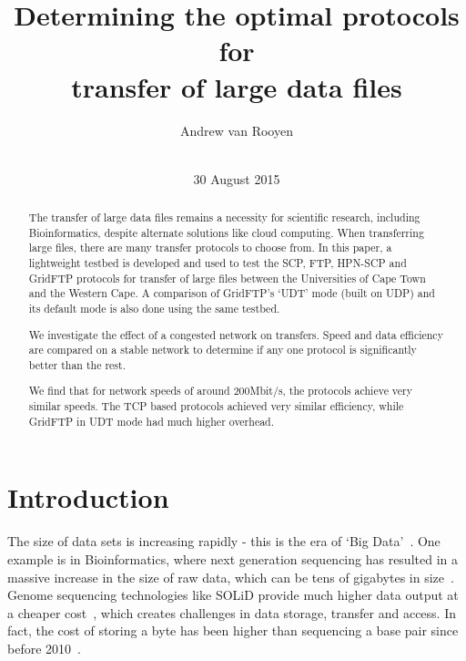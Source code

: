 \documentclass{sig-alternate-05-2015}
\begin{document}
\title{Determining the optimal protocols for\\transfer of large data files}

\author{
\alignauthor Andrew van Rooyen\\
\\
}

\date{30 August 2015}


\maketitle
\begin{abstract}
The transfer of large data files remains a necessity for scientific research, including Bioinformatics, despite alternate solutions like cloud computing. When transferring large files, there are many transfer protocols to choose from. In this paper, a lightweight testbed is developed and used to test the SCP, FTP, HPN-SCP and GridFTP protocols for transfer of large files between the Universities of Cape Town and the Western Cape.
A comparison of GridFTP's `UDT' mode (built on UDP) and its default mode is also done using the same testbed.

We investigate the effect of a congested network on transfers. Speed and data efficiency are compared on a stable network to determine if any one protocol is significantly better than the rest.

We find that for network speeds of around 200Mbit/s, the protocols achieve very similar speeds. The TCP based protocols achieved very similar efficiency, while GridFTP in UDT mode had much higher overhead.
\end{abstract}

\section{Introduction}
The size of data sets is increasing rapidly - this is the era of `Big Data'~\cite{manyika2011big}. One example is in Bioinformatics, where next generation sequencing has resulted in a massive increase in the size of raw data, which can be tens of gigabytes in size~\cite{deorowicz2011compression}. Genome sequencing technologies like SOLiD provide much higher data output at a cheaper cost~\cite{shendure2008next}, which creates challenges in data storage, transfer and access. In fact, the cost of storing a byte has been higher than sequencing a base pair since before 2010~\cite{baker2010next}.
\end{document}

